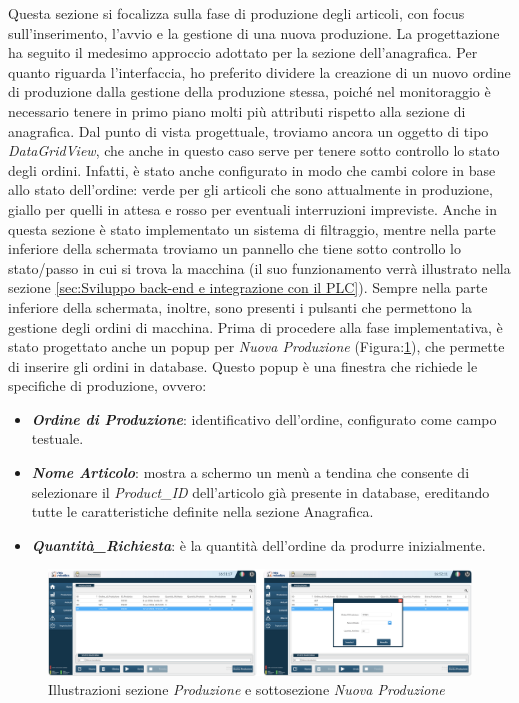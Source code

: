Questa sezione si focalizza sulla fase di produzione degli articoli, con focus sull'inserimento, l'avvio e la gestione di una nuova produzione. La progettazione ha seguito il medesimo approccio adottato per la sezione dell'anagrafica. Per quanto riguarda l'interfaccia, ho preferito dividere la creazione di un nuovo ordine di produzione dalla gestione della produzione stessa, poiché nel monitoraggio è necessario tenere in primo piano molti più attributi rispetto alla sezione di anagrafica. Dal punto di vista progettuale, troviamo ancora un oggetto di tipo \textit{DataGridView}, che anche in questo caso serve per tenere sotto controllo lo stato degli ordini. Infatti, è stato anche configurato in modo che cambi colore in base allo stato dell'ordine: verde per gli articoli che sono attualmente in produzione, giallo per quelli in attesa e rosso per eventuali interruzioni impreviste. Anche in questa sezione è stato implementato un sistema di filtraggio, mentre nella parte inferiore della schermata troviamo un pannello che tiene sotto controllo lo stato/passo in cui si trova la macchina (il suo funzionamento verrà illustrato nella sezione \ref{sec:Sviluppo back-end e integrazione con il PLC}). Sempre nella parte inferiore della schermata, inoltre, sono presenti i pulsanti che permettono la gestione degli ordini di macchina. Prima di procedere alla fase implementativa, è stato progettato anche un popup per \textit{Nuova Produzione} (Figura:\ref{fig:Produzione.png}), che permette di inserire gli ordini in database. Questo popup è una finestra che richiede le specifiche di produzione, ovvero:
\begin{itemize}
    \item \textit{\textbf{Ordine di Produzione}}: identificativo dell'ordine, configurato come campo testuale.
    \item \textit{\textbf{Nome Articolo}}: mostra a schermo un menù a tendina che consente di selezionare il \textit{Product\_ID} dell'articolo già presente in database, ereditando tutte le caratteristiche definite nella sezione Anagrafica.
    \item \textit{\textbf{Quantità\_Richiesta}}: è la quantità dell'ordine da produrre inizialmente.
\end{itemize}

\begin{figure} 
    \centering
    \includegraphics[width=1\linewidth]{Immagini/Produzione.png}
    \caption{Illustrazioni sezione \textit{Produzione} e sottosezione \textit{Nuova Produzione}}
    \label{fig:Produzione.png}
\end{figure}

